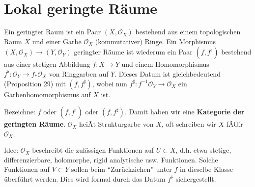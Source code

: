 \section{Lokal geringte Räume}
\begin{defn}
Ein geringter Raum ist ein Paar $(X,\mathcal{O}_{X})$ bestehend aus
einem topologischen Raum $X$ und einer Garbe $\mathcal{O}_{X}$ (kommutativer)
Ringe. Ein Morphismus $(X,\mathcal{O}_{X})\rightarrow(Y,\mathcal{O}_{Y})$
geringter Räume ist wiederum ein Paar $(f,f^{\flat})$ bestehend aus
einer stetigen Abbildung $f:X\rightarrow Y$ und einem Homomorphismus
$f^{\flat}:\mathcal{O}_{Y}\rightarrow f_{\ast}\mathcal{O}_{X}$ von
Ringgarben auf $Y$. Dieses Datum ist gleichbedeutend (Proposition
29) mit $(f,f^{\sharp})$, wobei nun $f^{\sharp}:f^{-1}\mathcal{O}_{Y}\rightarrow\mathcal{O}_{X}$
ein Garbenhomomorphismus auf $X$ ist.

Bezeichne: $f$ oder $(f,f^{\flat})$ oder $(f,f^{\sharp})$. Damit
haben wir eine \textbf{Kategorie der geringten Räume}. $\mathcal{O}_{X}$
heiÃt Strukturgarbe von $X$, oft schreiben
wir $X$ fÃŒr $\mathcal{O}_{X}$.

Idee: $\mathcal{O}_{X}$ beschreibt die zulässigen Funktionen auf
$U\subset X$, d.h. etwa stetige, differenzierbare, holomorphe, rigid
analytische usw. Funktionen. Solche Funktionen auf $V\subset Y$ sollen
beim ``Zurückziehen'' unter $f$ in dieselbe Klasse überführt werden.
Dies wird formal durch das Datum $f^{\flat}$ sichergestellt.
\end{defn}

